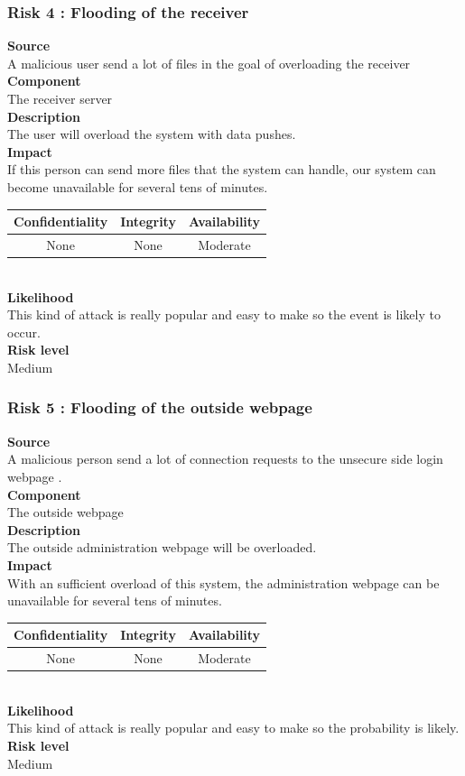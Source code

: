\documentclass[a4paper,11pt]{article}
\begin{document}
\subsubsection{Risk 4 : Flooding of the receiver }
\textbf{Source} \\A malicious user send a lot of files in the goal of overloading the receiver\\
\textbf{Component} \\The receiver server\\
\textbf{Description}\\ The user will overload the system with data pushes. 
\\
\textbf{Impact}\\
 If this person can send more files that the system can handle, our system can become unavailable for several tens of minutes. \\
\begin{tabular}{|c|c|c|}
\hline
Confidentiality & Integrity & Availability \\
\hline
None & None & Moderate \\
\hline
\end{tabular}\\
\textbf{Likelihood}\\ This kind of attack is really popular and easy to make so the event is likely to occur.\\
\textbf{Risk level}\\Medium\\

\subsubsection{Risk 5 : Flooding of the outside webpage}
\textbf{Source} \\A malicious person send a lot of connection requests to the unsecure side login webpage . \\
\textbf{Component} \\The outside webpage\\
\textbf{Description}\\ The outside administration webpage will be overloaded. \\
\textbf{Impact}\\
With an sufficient overload of this system, the administration webpage can be unavailable for several tens of minutes.\\
\begin{tabular}{|c|c|c|}
\hline
Confidentiality & Integrity & Availability \\
\hline
None & None & Moderate \\
\hline
\end{tabular}\\
\textbf{Likelihood}\\ This kind of attack is really popular and easy to make so the probability is likely.\\
\textbf{Risk level}\\Medium\\
\end{document}
